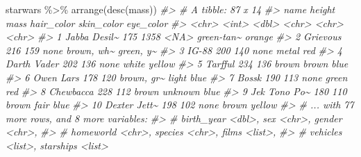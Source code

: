 \documentclass[
]{book}
\newenvironment{Shaded}{\begin{snugshade}}{\end{snugshade}}
\newcommand{\CommentTok}[1]{\textcolor[rgb]{0.56,0.35,0.01}{\textit{#1}}}
\newcommand{\FunctionTok}[1]{\textcolor[rgb]{0.00,0.00,0.00}{#1}}
\newcommand{\NormalTok}[1]{#1}
\newcommand{\SpecialCharTok}[1]{\textcolor[rgb]{0.00,0.00,0.00}{#1}}
\begin{document}
\begin{Shaded}
\begin{Highlighting}[]
\NormalTok{starwars }\SpecialCharTok{\%\textgreater{}\%} 
  \FunctionTok{arrange}\NormalTok{(}\FunctionTok{desc}\NormalTok{(mass))}
\CommentTok{\#\textgreater{} \# A tibble: 87 x 14}
\CommentTok{\#\textgreater{}    name         height  mass hair\_color skin\_color eye\_color}
\CommentTok{\#\textgreater{}    \textless{}chr\textgreater{}         \textless{}int\textgreater{} \textless{}dbl\textgreater{} \textless{}chr\textgreater{}      \textless{}chr\textgreater{}      \textless{}chr\textgreater{}    }
\CommentTok{\#\textgreater{}  1 Jabba Desil\textasciitilde{}    175  1358 \textless{}NA\textgreater{}       green{-}tan\textasciitilde{} orange   }
\CommentTok{\#\textgreater{}  2 Grievous        216   159 none       brown, wh\textasciitilde{} green, y\textasciitilde{}}
\CommentTok{\#\textgreater{}  3 IG{-}88           200   140 none       metal      red      }
\CommentTok{\#\textgreater{}  4 Darth Vader     202   136 none       white      yellow   }
\CommentTok{\#\textgreater{}  5 Tarfful         234   136 brown      brown      blue     }
\CommentTok{\#\textgreater{}  6 Owen Lars       178   120 brown, gr\textasciitilde{} light      blue     }
\CommentTok{\#\textgreater{}  7 Bossk           190   113 none       green      red      }
\CommentTok{\#\textgreater{}  8 Chewbacca       228   112 brown      unknown    blue     }
\CommentTok{\#\textgreater{}  9 Jek Tono Po\textasciitilde{}    180   110 brown      fair       blue     }
\CommentTok{\#\textgreater{} 10 Dexter Jett\textasciitilde{}    198   102 none       brown      yellow   }
\CommentTok{\#\textgreater{} \# ... with 77 more rows, and 8 more variables:}
\CommentTok{\#\textgreater{} \#   birth\_year \textless{}dbl\textgreater{}, sex \textless{}chr\textgreater{}, gender \textless{}chr\textgreater{},}
\CommentTok{\#\textgreater{} \#   homeworld \textless{}chr\textgreater{}, species \textless{}chr\textgreater{}, films \textless{}list\textgreater{},}
\CommentTok{\#\textgreater{} \#   vehicles \textless{}list\textgreater{}, starships \textless{}list\textgreater{}}


\end{Highlighting}
\end{Shaded}
\end{document}
